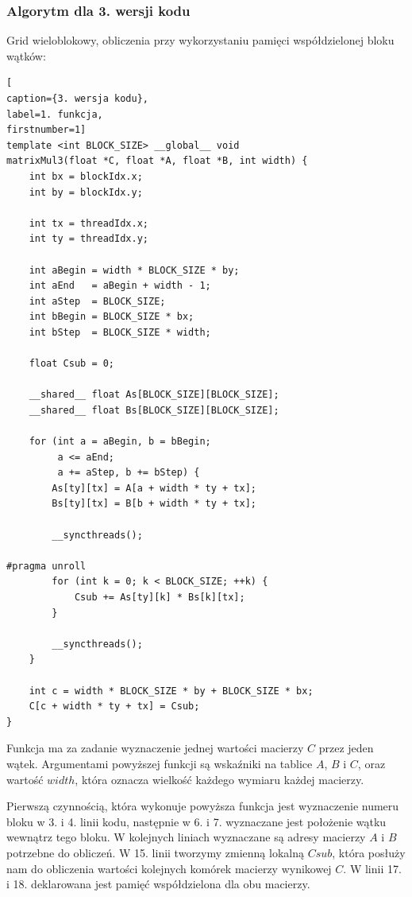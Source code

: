 \documentclass{article}
\begin{document}
\subsubsection{Algorytm dla 3. wersji kodu}
Grid wieloblokowy, obliczenia przy wykorzystaniu pamięci współdzielonej bloku wątków:
\begin{lstlisting}[
caption={3. wersja kodu},
label=1. funkcja,
firstnumber=1]
template <int BLOCK_SIZE> __global__ void
matrixMul3(float *C, float *A, float *B, int width) {
    int bx = blockIdx.x;
    int by = blockIdx.y;
    
    int tx = threadIdx.x;
    int ty = threadIdx.y;
    
    int aBegin = width * BLOCK_SIZE * by;
    int aEnd   = aBegin + width - 1;
    int aStep  = BLOCK_SIZE;
    int bBegin = BLOCK_SIZE * bx;
    int bStep  = BLOCK_SIZE * width;
    
    float Csub = 0;

    __shared__ float As[BLOCK_SIZE][BLOCK_SIZE];
    __shared__ float Bs[BLOCK_SIZE][BLOCK_SIZE];

    for (int a = aBegin, b = bBegin; 
    	 a <= aEnd;
    	 a += aStep, b += bStep) {
        As[ty][tx] = A[a + width * ty + tx];
        Bs[ty][tx] = B[b + width * ty + tx];
        
        __syncthreads();
        
#pragma unroll
        for (int k = 0; k < BLOCK_SIZE; ++k) {
            Csub += As[ty][k] * Bs[k][tx];
        }

        __syncthreads();
    }
    
    int c = width * BLOCK_SIZE * by + BLOCK_SIZE * bx;
    C[c + width * ty + tx] = Csub;    
}
\end{lstlisting}

Funkcja ma za zadanie wyznaczenie jednej wartości macierzy $C$ przez jeden wątek. Argumentami powyższej funkcji są wskaźniki na tablice $A$, $B$ i $C$, oraz wartość $width$, która oznacza wielkość każdego wymiaru każdej macierzy.

Pierwszą czynnością, która wykonuje powyższa funkcja jest wyznaczenie numeru bloku w 3. i 4. linii kodu, następnie w 6. i 7. wyznaczane jest położenie wątku wewnątrz tego bloku. W kolejnych liniach wyznaczane są adresy macierzy $A$ i $B$ potrzebne do obliczeń. W 15. linii tworzymy zmienną lokalną $Csub$, która posłuży nam do obliczenia wartości kolejnych komórek macierzy wynikowej $C$. W linii 17. i 18. deklarowana jest pamięć współdzielona dla obu macierzy.
\end{document}
